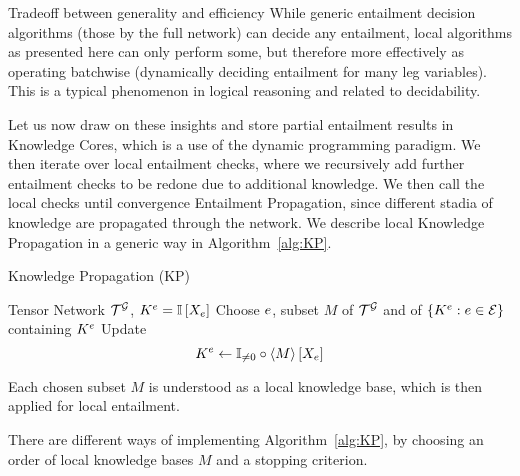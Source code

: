\begin{remark}{Tradeoff between generality and efficiency}
	While generic entailment decision algorithms (those by the full network) can decide any entailment, local algorithms as presented here can only perform some, but therefore more effectively as operating batchwise (dynamically deciding entailment for many leg variables).
	This is a typical phenomenon in logical reasoning and related to decidability.
\end{remark}



Let us now draw on these insights and store partial entailment results in Knowledge Cores, which is a use of the dynamic programming paradigm.
We then iterate over local entailment checks, where we recursively add further entailment checks to be redone due to additional knowledge.
We then call the local checks until convergence Entailment Propagation, since different stadia of knowledge are propagated through the network.
We describe local Knowledge Propagation in a generic way in Algorithm~\ref{alg:KP}.

\begin{algorithm}[hbt!]
\caption{Knowledge Propagation (KP)}\label{alg:KP}
\begin{algorithmic}
\State Tensor Network $\mathcal{T}^{\mathcal{G}}$, $K^{e}=\mathbb{I}\left[X_{e}\right]$
	\State Choose $e$, subset $M$ of $\mathcal{T}^{\mathcal{G}}$ and of $\{K^{e} : e\in\mathcal{E} \}$ containing $K^{e}$
	\State Update 
		\[ K^{e} \leftarrow \mathbb{I}_{\neq0}\circ\left\langle M\right\rangle \left[ X_{e} \right] \]
\EndWhile
\end{algorithmic}
\end{algorithm}

Each chosen subset $M$ is understood as a local knowledge base, which is then applied for local entailment.

%

There are different ways of implementing Algorithm~\ref{alg:KP}, by choosing an order of local knowledge bases $M$ and a stopping criterion.


